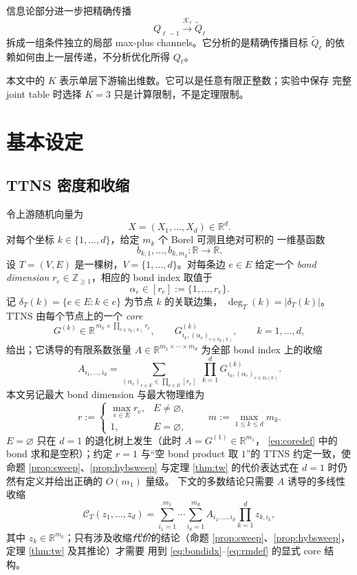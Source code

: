 \documentclass[a4paper,11pt]{article}
\theoremstyle{definition}
\newcommand{\R}{\mathbb R}
\newcommand{\Z}{\mathbb Z}
\newcommand{\1}{\mathbf 1}
\begin{document}
信息论部分进一步把精确传播
\[
Q_{\ell-1}\xrightarrow{\mathcal K_\ell}\widetilde Q_\ell
\]
拆成一组条件独立的局部 max-plus channels。它分析的是精确传播目标
$\widetilde Q_\ell$ 的依赖如何由上一层传递，不分析优化所得 $Q_\ell$。

本文中的 $K$ 表示单层下游输出维数。它可以是任意有限正整数；实验中保存
完整 joint table 时选择 $K=3$ 只是计算限制，不是定理限制。

\section{基本设定}

\subsection{TTNS 密度和收缩}

令上游随机向量为
\[
X=(X_1,\ldots,X_d)\in \R^d.
\]
对每个坐标 $k\in\{1,\ldots,d\}$，给定 $m_k$ 个 Borel 可测且绝对可积的
一维基函数
\[
b_{k,1},\ldots,b_{k,m_k}:\R\to\R.
\]
设 $T=(V,E)$ 是一棵树，$V=\{1,\ldots,d\}$。对每条边 $e\in E$ 给定一个
\emph{bond dimension} $r_e\in\Z_{\ge1}$，相应的 bond index 取值于
\begin{equation}
\label{eq:bondidx}
\alpha_e\in[r_e]:=\{1,\ldots,r_e\} .
\end{equation}
记 $\delta_T(k)=\{e\in E:k\in e\}$ 为节点 $k$ 的关联边集，
$\deg_T(k)=|\delta_T(k)|$。TTNS 由每个节点上的一个 \emph{core}
\begin{equation}
\label{eq:coredef}
G^{(k)}
\in
\R^{\,m_k\times\prod_{e\in\delta_T(k)}r_e},
\qquad
G^{(k)}_{i_k,(\alpha_e)_{e\in\delta_T(k)}},
\qquad k=1,\ldots,d,
\end{equation}
给出；它诱导的有限系数张量 $A\in\R^{m_1\times\cdots\times m_d}$ 为全部
bond index 上的收缩
\begin{equation}
\label{eq:coretensor}
A_{i_1,\ldots,i_d}
=
\sum_{(\alpha_e)_{e\in E}\in\prod_{e\in E}[r_e]}
\;\prod_{k=1}^{d}
G^{(k)}_{i_k,(\alpha_e)_{e\in\delta_T(k)}} .
\end{equation}
本文另记最大 bond dimension 与最大物理维为
\begin{equation}
\label{eq:rmdef}
r:=
\begin{cases}
\max_{e\in E}r_e, & E\ne\varnothing,\\[2pt]
1, & E=\varnothing,
\end{cases}
\qquad
m:=\max_{1\le k\le d}m_k .
\end{equation}
$E=\varnothing$ 只在 $d=1$ 的退化树上发生（此时 $A=G^{(1)}\in\R^{m_1}$，
\eqref{eq:coredef} 中的 bond 求和是空积）；约定 $r=1$ 与“空 bond product 取
$1$”的 TTNS 约定一致，使命题 \ref{prop:sweep}、\ref{prop:hybsweep} 与定理
\ref{thm:tw} 的代价表达式在 $d=1$ 时仍然有定义并给出正确的 $O(m_1)$ 量级。
下文的多数结论只需要 $A$ 诱导的多线性收缩
\[
\mathcal C_T(z_1,\ldots,z_d)
=
\sum_{i_1=1}^{m_1}\cdots\sum_{i_d=1}^{m_d}
A_{i_1,\ldots,i_d}\prod_{k=1}^{d}z_{k,i_k},
\]
其中 $z_k\in\R^{m_k}$；只有涉及收缩\emph{代价}的结论（命题
\ref{prop:sweep}、\ref{prop:hybsweep}，定理 \ref{thm:tw} 及其推论）才需要
用到 \eqref{eq:bondidx}--\eqref{eq:rmdef} 的显式 core 结构。
\end{document}
